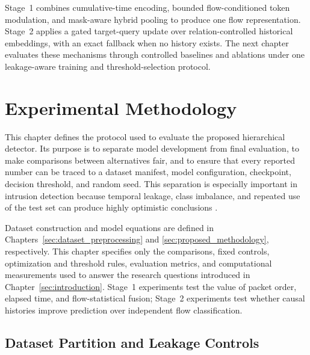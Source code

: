 \documentclass[11pt,fleqn]{report}
\begin{document}
Stage~1 combines cumulative-time encoding, bounded flow-conditioned token
modulation, and mask-aware hybrid pooling to produce one flow representation.
Stage~2 applies a gated target-query update over relation-controlled historical
embeddings, with an exact fallback when no history exists. The next chapter
evaluates these mechanisms through controlled baselines and ablations under one
leakage-aware training and threshold-selection protocol.

\providecommand{\ExpPlatform}{Google Colaboratory Pro+}
\providecommand{\ExpComputeBudget}{600 purchased compute units}
\providecommand{\ExpGPU}{NVIDIA T4 (16~GB) for Stage~1; NVIDIA L4 (24~GB) for Stage~2}
\providecommand{\ExpCPU}{Google Colab hosted CPU; exact model not retained in the run metadata}
\providecommand{\ExpOS}{Google Colab hosted Linux runtime}
\providecommand{\ExpSoftware}{PyTorch and scikit-learn on CUDA; exact version snapshot not retained}
\providecommand{\ExpSuricata}{Suricata with the custom output module; exact version and revision not retained}
\chapter{Experimental Methodology}
\label{sec:experimental_methodology}

This chapter defines the protocol used to evaluate the proposed hierarchical
detector. Its purpose is to separate model development from final evaluation,
to make comparisons between alternatives fair, and to ensure that every
reported number can be traced to a dataset manifest, model configuration,
checkpoint, decision threshold, and random seed. This separation is especially
important in intrusion detection because temporal leakage, class imbalance,
and repeated use of the test set can produce highly optimistic conclusions
\cite{SommerPaxson2010,Arp2022DosDonts}.

Dataset construction and model equations are defined in
Chapters~\ref{sec:dataset_preprocessing} and
\ref{sec:proposed_methodology}, respectively. This chapter specifies only the
comparisons, fixed controls, optimization and threshold rules, evaluation
metrics, and computational measurements used to answer the research questions
introduced in Chapter~\ref{sec:introduction}. Stage~1 experiments test the
value of packet order, elapsed time, and flow-statistical fusion; Stage~2
experiments test whether causal histories improve prediction over independent
flow classification.
\section{Dataset Partition and Leakage Controls}
\label{subsec:experimental_data_protocol}
\end{document}
